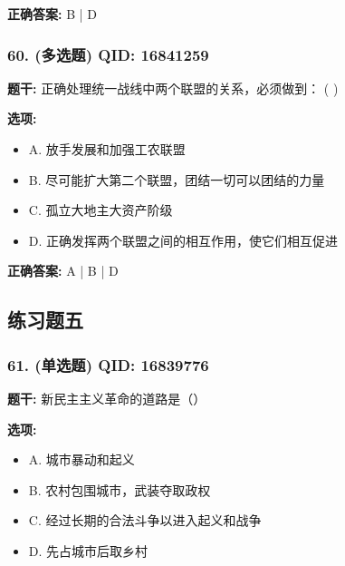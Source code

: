\documentclass[12pt,UTF8]{ctexart}
\begin{document}
\textbf{正确答案:}
B | D

\vspace{0.3em}\hrulefill\vspace{0.7em}

\subsubsection*{60. (多选题) \small QID: 16841259}

\textbf{题干:}
正确处理统一战线中两个联盟的关系，必须做到： ( )

\textbf{选项:}
\begin{itemize}[leftmargin=*]

  \item A. 放手发展和加强工农联盟

  \item B. 尽可能扩大第二个联盟，团结一切可以团结的力量

  \item C. 孤立大地主大资产阶级

  \item D. 正确发挥两个联盟之间的相互作用，使它们相互促进

\end{itemize}

\textbf{正确答案:}
A | B | D

\vspace{0.3em}\hrulefill\vspace{0.7em}

\subsection*{练习题五}

\subsubsection*{61. (单选题) \small QID: 16839776}

\textbf{题干:}
新民主主义革命的道路是（）

\textbf{选项:}
\begin{itemize}[leftmargin=*]

  \item A. 城市暴动和起义

  \item B. 农村包围城市，武装夺取政权

  \item C. 经过长期的合法斗争以进入起义和战争

  \item D. 先占城市后取乡村

\end{itemize}
\end{document}
